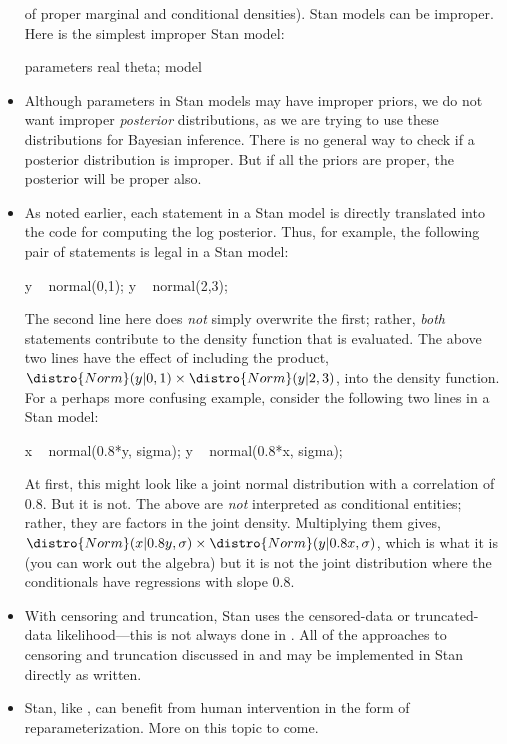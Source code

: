 \begin{itemize}
  of proper marginal and conditional densities).  Stan models can be
  improper.  Here is the simplest improper Stan model:
\begin{stancode}
parameters {
  real theta;
}
model { }
\end{stancode}
\item Although parameters in Stan models may have improper priors, we
  do not want improper \emph{posterior} distributions, as we are trying to
  use these distributions for Bayesian inference.  There is no general
  way to check if a posterior distribution is improper.  But if all
  the priors are proper, the posterior will be proper also.
\item
  As noted earlier, each statement in a Stan model is directly translated into the \Cpp code for computing the log posterior.  Thus, for example, the following pair of statements is legal in a Stan model:
\begin{stancode}
y ~ normal(0,1);
y ~ normal(2,3);
\end{stancode}
%
The second line here does \emph{not} simply overwrite the first;
rather, \emph{both} statements contribute to the density function that
is evaluated.  The above two lines have the effect of including the
product, $\distro{Norm}(y|0,1) \times \distro{Norm}(y|2,3)$, into the
density function.
\\[6pt]
For a perhaps more confusing example, consider the following two lines in a Stan model:
\begin{stancode}
x ~ normal(0.8*y, sigma);
y ~ normal(0.8*x, sigma);
\end{stancode}
%
At first, this might look like a joint normal distribution with a
correlation of 0.8.  But it is not.  The above are \emph{not}
interpreted as conditional entities; rather, they are factors in the
joint density.  Multiplying them gives, $\distro{Norm}(x|0.8y,\sigma)
\times \distro{Norm}(y|0.8x,\sigma)$, which is what it is (you can
work out the algebra) but it is not the joint distribution where the
conditionals have regressions with slope 0.8.
%
\item With censoring and truncation, Stan uses the censored-data or
  truncated-data likelihood---this is not always done in \BUGS.  All
  of the approaches to censoring and truncation discussed in
  \citep{GelmanEtAl:2013} and \citep{GelmanHill:2007} may
  be implemented in Stan directly as written.
%
\item Stan, like \BUGS, can benefit from human intervention in the
  form of reparameterization.  More on this topic to come.
\end{itemize}

